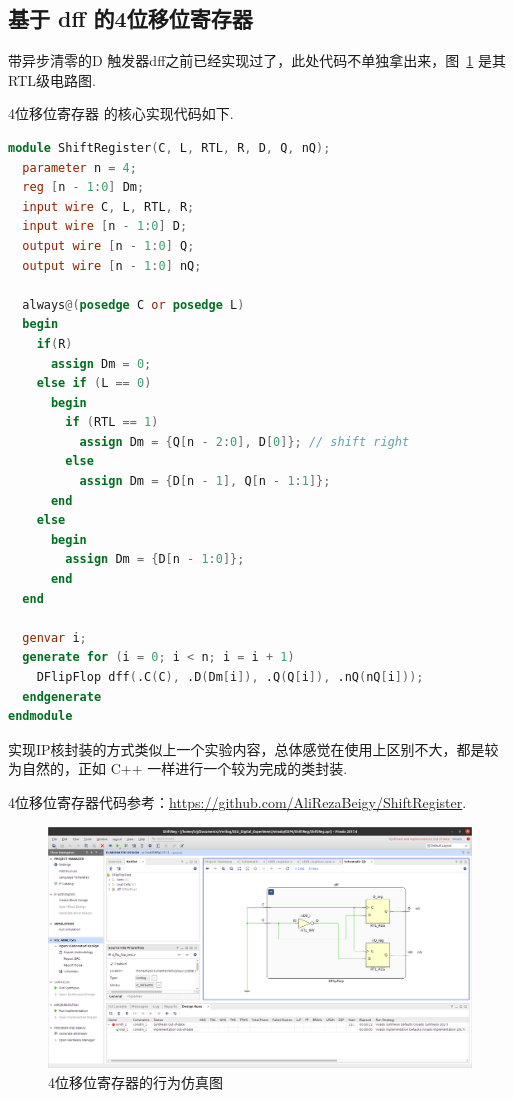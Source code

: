 \documentclass[11pt]{SEU-Digital-Report}
\begin{document}
      \subsection{基于 dff 的4位移位寄存器}

      带异步清零的D 触发器dff之前已经实现过了，此处代码不单独拿出来，图~\ref{fig:DFF_RTL} 是其RTL级电路图.
      
      4位移位寄存器 的核心实现代码如下.
      \begin{lstlisting}[language=verilog]
module ShiftRegister(C, L, RTL, R, D, Q, nQ);
  parameter n = 4;
  reg [n - 1:0] Dm;
  input wire C, L, RTL, R;
  input wire [n - 1:0] D;
  output wire [n - 1:0] Q;
  output wire [n - 1:0] nQ;

  always@(posedge C or posedge L)
  begin
    if(R)
      assign Dm = 0;
    else if (L == 0)
      begin
        if (RTL == 1)
          assign Dm = {Q[n - 2:0], D[0]}; // shift right
        else
          assign Dm = {D[n - 1], Q[n - 1:1]};
      end
    else
      begin
        assign Dm = {D[n - 1:0]};
      end
  end

  genvar i;
  generate for (i = 0; i < n; i = i + 1)
    DFlipFlop dff(.C(C), .D(Dm[i]), .Q(Q[i]), .nQ(nQ[i]));
  endgenerate
endmodule
      \end{lstlisting}

      \begin{analyze}{}{}
        实现IP核封装的方式类似上一个实验内容，总体感觉在使用上区别不大，都是较为自然的，正如 C++ 一样进行一个较为完成的类封装.

        4位移位寄存器代码参考：\url{https://github.com/AliRezaBeigy/ShiftRegister}.
      \end{analyze}

      \begin{figure}[htbp]
        \centering
        \includegraphics[width=\linewidth]{fig/DFF_RTL.png}
        \caption{4位移位寄存器的行为仿真图}
        \label{fig:DFF_RTL}
      \end{figure}
\end{document}
